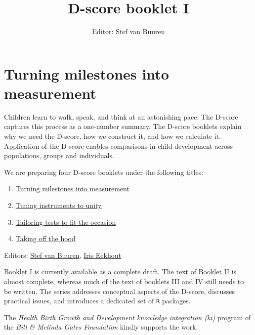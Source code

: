\documentclass[
]{book}
\title{D-score booklet I}
\author{Editor: Stef van Buuren}
\date{}
\providecommand{\tightlist}{%
  \setlength{\itemsep}{0pt}\setlength{\parskip}{0pt}}
\begin{document}
\maketitle

{
\setcounter{tocdepth}{1}
\tableofcontents
}
\hypertarget{turning-milestones-into-measurement}{%
\chapter*{Turning milestones into measurement}\label{turning-milestones-into-measurement}}

Children learn to walk, speak, and think at an astonishing pace. The D-score captures this process as a one-number summary. The D-score booklets explain why we need the D-score, how we construct it, and how we calculate it. Application of the D-score enables comparisons in child development across populations, groups and individuals.

We are preparing four D-score booklets under the following titles:

\begin{enumerate}
\def\labelenumi{\Roman{enumi}.}
\tightlist
\item
  \href{https://stefvanbuuren.name/dbook1}{Turning milestones into measurement}
\item
  \href{https://stefvanbuuren.name/dbook2}{Tuning instruments to unity}
\item
  \href{https://stefvanbuuren.name/dbook3}{Tailoring tests to fit the occasion}
\item
  \href{https://stefvanbuuren.name/dbook4}{Taking off the hood}
\end{enumerate}

Editors: \href{https://stefvanbuuren.name}{Stef van Buuren}, \href{https://www.iriseekhout.com}{Iris Eekhout}

\href{https://stefvanbuuren.name/dbook1}{Booklet I} is currently available as a complete draft. The text of \href{https://stefvanbuuren.name/dbook2}{Booklet II} is almost complete, whereas much of the text of booklets III and IV still needs to be written. The series addresses conceptual aspects of the D-score, discusses practical issues, and introduces a dedicated set of \texttt{R} packages.

The \emph{Health Birth Growth and Development knowledge integration (ki)} program of the \emph{Bill \& Melinda Gates Foundation} kindly supports the work.
\end{document}
